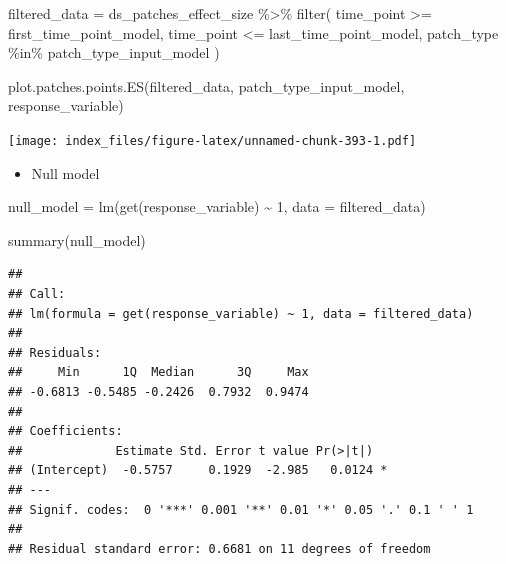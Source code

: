 \documentclass[
]{article}
\newenvironment{Shaded}{\begin{snugshade}}{\end{snugshade}}
\newcommand{\AttributeTok}[1]{\textcolor[rgb]{0.77,0.63,0.00}{#1}}
\newcommand{\DecValTok}[1]{\textcolor[rgb]{0.00,0.00,0.81}{#1}}
\newcommand{\FunctionTok}[1]{\textcolor[rgb]{0.00,0.00,0.00}{#1}}
\newcommand{\NormalTok}[1]{#1}
\newcommand{\OtherTok}[1]{\textcolor[rgb]{0.56,0.35,0.01}{#1}}
\newcommand{\SpecialCharTok}[1]{\textcolor[rgb]{0.00,0.00,0.00}{#1}}
\providecommand{\tightlist}{%
  \setlength{\itemsep}{0pt}\setlength{\parskip}{0pt}}
\begin{document}
\begin{Shaded}
\begin{Highlighting}[]
\NormalTok{filtered\_data }\OtherTok{=}\NormalTok{ ds\_patches\_effect\_size }\SpecialCharTok{\%\textgreater{}\%}
  \FunctionTok{filter}\NormalTok{(}
\NormalTok{    time\_point }\SpecialCharTok{\textgreater{}=}\NormalTok{ first\_time\_point\_model,}
\NormalTok{    time\_point }\SpecialCharTok{\textless{}=}\NormalTok{ last\_time\_point\_model,}
\NormalTok{    patch\_type }\SpecialCharTok{\%in\%}\NormalTok{ patch\_type\_input\_model}
\NormalTok{  )}
\end{Highlighting}
\end{Shaded}

\begin{Shaded}
\begin{Highlighting}[]
\FunctionTok{plot.patches.points.ES}\NormalTok{(filtered\_data,}
\NormalTok{                       patch\_type\_input\_model,}
\NormalTok{                       response\_variable)}
\end{Highlighting}
\end{Shaded}

\texttt{[image: index\_files/figure-latex/unnamed-chunk-393-1.pdf]}

\begin{itemize}
\tightlist
\item
  Null model
\end{itemize}

\begin{Shaded}
\begin{Highlighting}[]
\NormalTok{null\_model }\OtherTok{=} \FunctionTok{lm}\NormalTok{(}\FunctionTok{get}\NormalTok{(response\_variable) }\SpecialCharTok{\textasciitilde{}}
                  \DecValTok{1}\NormalTok{,}
                \AttributeTok{data =}\NormalTok{ filtered\_data)}

\FunctionTok{summary}\NormalTok{(null\_model)}
\end{Highlighting}
\end{Shaded}

\begin{verbatim}
## 
## Call:
## lm(formula = get(response_variable) ~ 1, data = filtered_data)
## 
## Residuals:
##     Min      1Q  Median      3Q     Max 
## -0.6813 -0.5485 -0.2426  0.7932  0.9474 
## 
## Coefficients:
##             Estimate Std. Error t value Pr(>|t|)  
## (Intercept)  -0.5757     0.1929  -2.985   0.0124 *
## ---
## Signif. codes:  0 '***' 0.001 '**' 0.01 '*' 0.05 '.' 0.1 ' ' 1
## 
## Residual standard error: 0.6681 on 11 degrees of freedom
\end{verbatim}
\end{document}
